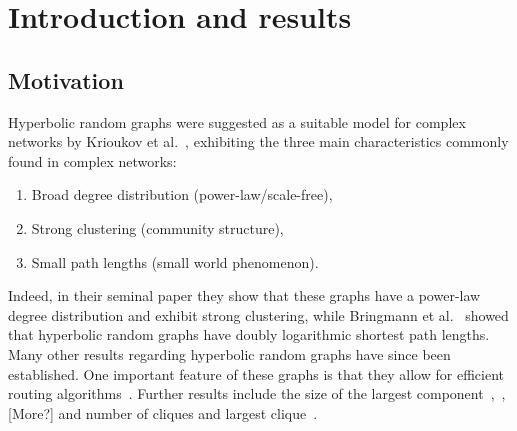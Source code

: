 \section{Introduction and results}

\subsection{Motivation}


Hyperbolic random graphs were suggested as a suitable model for complex networks by Krioukov et al.~\cite{krioukov2010hyperbolic}, exhibiting the three main characteristics commonly found in complex networks: 
\begin{enumerate}[\upshape 1)]
\item Broad degree distribution (power-law/scale-free),
\item Strong clustering (community structure),
\item Small path lengths (small world phenomenon).
\end{enumerate}
Indeed, in their seminal paper they show that these graphs have a power-law degree distribution and exhibit strong clustering, while Bringmann et al.~\cite{bringmann2016average} showed that hyperbolic random graphs have doubly logarithmic shortest path lengths. Many other results regarding hyperbolic random graphs have since been established. One important feature of these graphs is that they allow for efficient routing algorithms~\cite{bringmann2017greedy}. Further results include the size of the largest component~\cite{BodeFountoulakisMuller2015},~\cite{fountoulakis2018law}, [More?] and number of cliques and largest clique~\cite{blasius2018cliques}.

